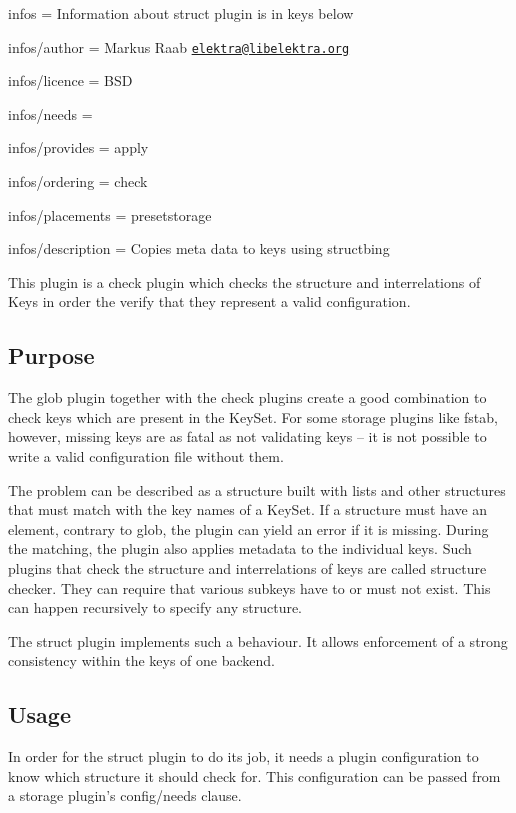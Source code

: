 
\begin{DoxyItemize}
\item infos = Information about struct plugin is in keys below
\item infos/author = Markus Raab \href{mailto:elektra@libelektra.org}{\tt elektra@libelektra.\+org}
\item infos/licence = B\+S\+D
\item infos/needs =
\item infos/provides = apply
\item infos/ordering = check
\item infos/placements = presetstorage
\item infos/description = Copies meta data to keys using structbing
\end{DoxyItemize}

This plugin is a check plugin which checks the structure and interrelations of Keys in order the verify that they represent a valid configuration.

\subsection*{Purpose}

The glob plugin together with the check plugins create a good combination to check keys which are present in the Key\+Set. For some storage plugins like fstab, however, missing keys are as fatal as not validating keys – it is not possible to write a valid configuration file without them.

The problem can be described as a structure built with lists and other structures that must match with the key names of a Key\+Set. If a structure must have an element, contrary to glob, the plugin can yield an error if it is missing. During the matching, the plugin also applies metadata to the individual keys. Such plugins that check the structure and interrelations of keys are called structure checker. They can require that various subkeys have to or must not exist. This can happen recursively to specify any structure.

The struct plugin implements such a behaviour. It allows enforcement of a strong consistency within the keys of one backend.

\subsection*{Usage}

In order for the {\ttfamily struct} plugin to do its job, it needs a plugin configuration to know which structure it should check for. This configuration can be passed from a storage plugin’s {\ttfamily config/needs} clause.

